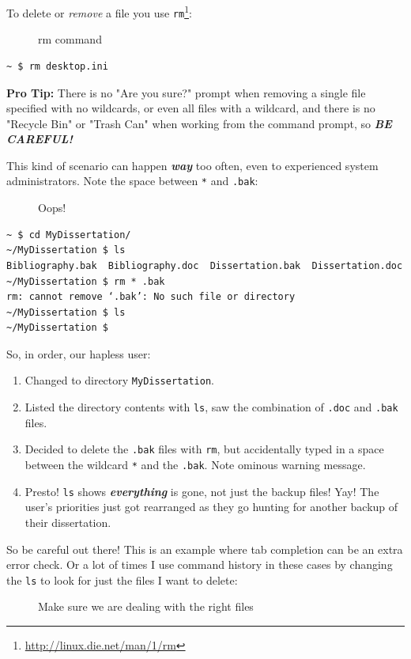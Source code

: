\documentclass[10pt,]{book}
\renewcommand{\href}[2]{#2\footnote{\url{#1}}}
\numberwithin{figure}{chapter}
\DeclareRobustCommand{\drcap}[1]{\begin{figure}[H]\caption{#1}\end{figure}}
\DeclareRobustCommand{\drcmd}[1]{\index{Commands!#1}}
\begin{document}
To delete or \emph{remove} a file you use
\href{http://linux.die.net/man/1/rm}{\texttt{rm}}\drcmd{rm}:

\drcap{rm command}

\begin{verbatim}
~ $ rm desktop.ini
\end{verbatim}

\textbf{Pro Tip:} There is no "Are you sure?" prompt when removing a
single file specified with no wildcards, or even all files with a
wildcard, and there is no "Recycle Bin" or "Trash Can" when working from
the command prompt, so \textbf{\emph{BE CAREFUL!}}

This kind of scenario can happen \textbf{\emph{way}} too often, even to
experienced system administrators. Note the space between \texttt{*} and
\texttt{.bak}:

\drcap{Oops!}

\begin{verbatim}
~ $ cd MyDissertation/
~/MyDissertation $ ls
Bibliography.bak  Bibliography.doc  Dissertation.bak  Dissertation.doc
~/MyDissertation $ rm * .bak
rm: cannot remove ‘.bak’: No such file or directory
~/MyDissertation $ ls
~/MyDissertation $ 
\end{verbatim}

So, in order, our hapless user:

\begin{enumerate}
\def\labelenumi{\arabic{enumi}.}
\item
  Changed to directory \texttt{MyDissertation}.
\item
  Listed the directory contents with \texttt{ls}, saw the combination of
  \texttt{.doc} and \texttt{.bak} files.
\item
  Decided to delete the \texttt{.bak} files with \texttt{rm}, but
  accidentally typed in a space between the wildcard \texttt{*} and the
  \texttt{.bak}. Note ominous warning message.
\item
  Presto! \texttt{ls} shows \textbf{\emph{everything}} is gone, not just
  the backup files! Yay! The user's priorities just got rearranged as
  they go hunting for another backup of their dissertation.
\end{enumerate}

So be careful out there! This is an example where tab completion can be
an extra error check. Or a lot of times I use command history in these
cases by changing the \texttt{ls} to look for just the files I want to
delete:

\drcap{Make sure we are dealing with the right files}
\end{document}
